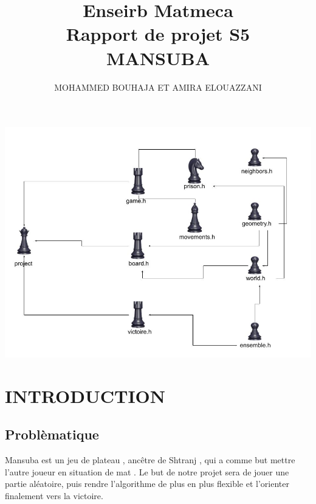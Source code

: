 \documentclass[a4paper]{article}
\begin{document}

\title{ Enseirb Matmeca \\ Rapport de projet S5 \\ MANSUBA }
\author{MOHAMMED BOUHAJA ET AMIRA ELOUAZZANI}
\maketitle





\newpage

\tableofcontents

\newpage


\begin{center}
\includegraphics[scale=0.5]{Dessin sans titre.jpg} 

\end{center}

\section{INTRODUCTION}
\subsection{Problèmatique}
Mansuba est un jeu de plateau , ancêtre de Shtranj , qui a comme but mettre l’autre joueur en situation de mat . 
Le but de notre projet sera de jouer une partie aléatoire, puis rendre l'algorithme de plus en plus flexible
et l'orienter finalement vers la victoire. 
\end{document}
